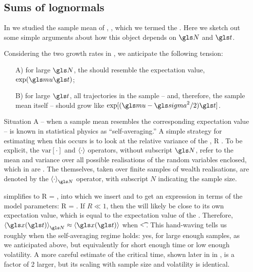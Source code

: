 \subsection{Sums of lognormals}
In \cite{PetersKlein2013} we studied the sample mean of \GBM, , which we termed the \PEA. Here we sketch out some simple arguments about how this object depends on $\N$ and $\t$.

Considering the two growth rates in , we anticipate the following tension:
\begin{enumerate}
\item[A)] for large $\N$, the \PEA should resemble the expectation value, $\exp(\gmu \t)$;
\item[B)] for large $\t$, all trajectories in the sample -- and, therefore, the sample mean itself -- should grow like $\exp[(\gmu-\gsigma^2/2)\t]$.
\end{enumerate}
Situation A -- when a sample mean resembles the corresponding expectation value -- is known in statistical physics as ``self-averaging.'' A simple strategy for estimating when this occurs is to look at the relative variance of the \PEA,
\be
R \equiv {}.
\ee
To be explicit, the $\text{var}[\cdot]$ and $\left\langle\cdot\right\rangle$ operators, without subscript $\N$, refer to the mean and variance over all possible realisations of the random variables enclosed, which in  are \PEAs. The \PEAs themselves, taken over finite samples of wealth realisations, are denoted by the $\ave{\cdot}_\N$ operator, with subscript $N$ indicating the sample size.

 simplifies to
\be
R = ,
\ee
into which we insert  and  to get an expression in terms of the \GBM model parameters:
\be
R = .
\ee
If $R \ll 1$, then the \PEA will likely be close to its own expectation value, which is equal to the expectation value of the \GBM. Therefore, $\ave{\x(\t)}_\N\approx\ave{\x(\t)}$ when
\be
\t < .
\ee
This hand-waving tells us roughly when the self-averaging regime holds: yes, for large enough samples, as we anticipated above, but equivalently for short enough time or low enough volatility. A more careful estimate of the critical time, shown later in in , is a factor of 2 larger, but its scaling with sample size and volatility is identical.

